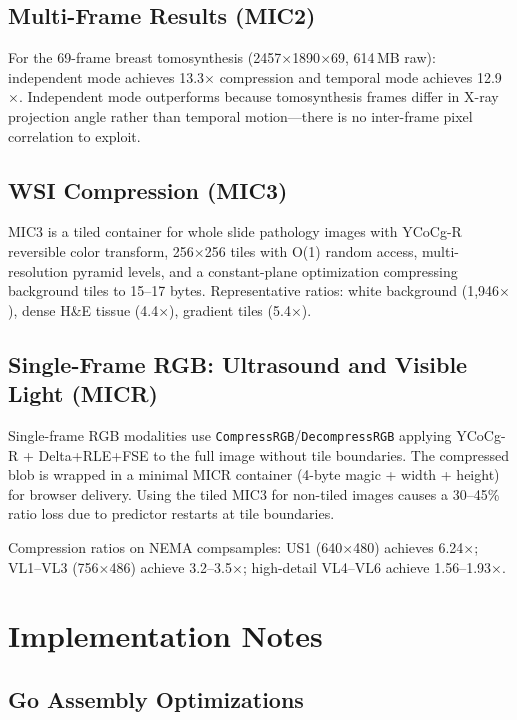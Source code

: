 \documentclass[10pt,twocolumn]{article}
\begin{document}
\subsection{Multi-Frame Results (MIC2)}

For the 69-frame breast tomosynthesis (2457$\times$1890$\times$69, 614\,MB raw): independent mode achieves 13.3$\times$ compression and temporal mode achieves 12.9$\times$. Independent mode outperforms because tomosynthesis frames differ in X-ray projection angle rather than temporal motion---there is no inter-frame pixel correlation to exploit.

\subsection{WSI Compression (MIC3)}

MIC3 is a tiled container for whole slide pathology images with YCoCg-R reversible color transform, 256$\times$256 tiles with O(1) random access, multi-resolution pyramid levels, and a constant-plane optimization compressing background tiles to 15--17 bytes. Representative ratios: white background (1,946$\times$), dense H\&E tissue (4.4$\times$), gradient tiles (5.4$\times$).

\subsection{Single-Frame RGB: Ultrasound and Visible Light (MICR)}
\label{sec:micr}

Single-frame RGB modalities use \texttt{CompressRGB}/\texttt{DecompressRGB} applying YCoCg-R + Delta+RLE+FSE to the full image without tile boundaries. The compressed blob is wrapped in a minimal MICR container (4-byte magic + width + height) for browser delivery. Using the tiled MIC3 for non-tiled images causes a 30--45\% ratio loss due to predictor restarts at tile boundaries.

Compression ratios on NEMA compsamples: US1 (640$\times$480) achieves 6.24$\times$; VL1--VL3 (756$\times$486) achieve 3.2--3.5$\times$; high-detail VL4--VL6 achieve 1.56--1.93$\times$.

\section{Implementation Notes}
\label{sec:impl}

\subsection{Go Assembly Optimizations}
\end{document}
